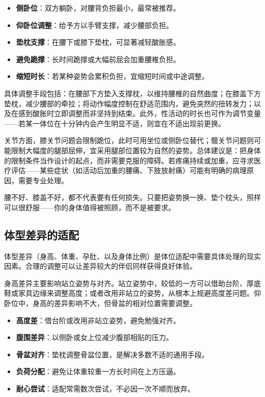 \documentclass[12pt,UTF8]{ctexbook}
\newcommand{\keyword}[1]{\textbf{#1}}
\begin{document}
\begin{itemize}
  \item \keyword{侧卧位}：双方躺卧，对腰背负担最小，最常被推荐。
  \item \keyword{仰卧位调整}：给予方以手臂支撑，减少腰部负担。
  \item \keyword{垫枕支撑}：在腰下或膝下垫枕，可显著减轻酸胀感。
  \item \keyword{避免跪撑}：长时间跪撑或大幅前屈会加重腰椎负担。
  \item \keyword{缩短时长}：若某种姿势会累积负担，宜缩短时间或中途调整。
\end{itemize}

具体调整手段包括：在腰部下方垫入支撑枕，以维持腰椎的自然曲度；在膝盖下方垫枕，减少腰部的牵拉；将动作幅度控制在舒适范围内，避免突然的扭转发力；以及在感到酸胀时立即调整而非坚持到结束。此外，性活动的时长也可作为调节变量——若某一体位在十分钟内会产生明显不适，则宜在不适出现前更换。

关节方面，膝关节问题会限制跪位，此时可用坐位或侧卧位替代；髋关节问题则可能限制大幅度的腿部屈伸，宜采用腿部位置较为自然的姿势。总体建议是：把身体的限制条件当作设计的起点，而非需要克服的障碍。若疼痛持续或加重，应寻求医疗评估——某些症状（如活动后加重的腰痛、下肢放射痛）可能有明确的病理原因，需要专业处理。

\begin{tcolorbox}[colback=pink!5!white,colframe=red!50!black,title=贴心小叮咛]
腰不好、膝盖不好，都不代表要有任何损失。只要把姿势换一换、垫个枕头，照样可以很舒服——你的身体值得被照顾，而不是被要求。
\end{tcolorbox}
\subsection{体型差异的适配}

体型差异（身高、体重、孕肚、以及身体比例）是体位适配中需要具体处理的现实因素。合理的调整可以让差异较大的伴侣同样获得良好体验。

身高差异主要影响站立姿势与对齐。站立姿势中，较低的一方可以借助台阶、厚底鞋或家具边缘来调整高度；或者改用非站立的姿势，从根本上规避高度差问题。仰卧位中，身高的差异影响不大，但骨盆的相对位置需要调整。

\begin{itemize}
  \item \keyword{高度差}：借台阶或改用非站立姿势，避免勉强对齐。
  \item \keyword{腹围差异}：以侧卧或女上位减少腹部相贴的压力。
  \item \keyword{骨盆对齐}：垫枕调整骨盆位置，是解决多数不适的通用手段。
  \item \keyword{负荷分配}：避免让体重较重一方长时间在上方压逼。
  \item \keyword{耐心尝试}：适配常需数次尝试，不必因一次不顺而放弃。
\end{itemize}
\end{document}
